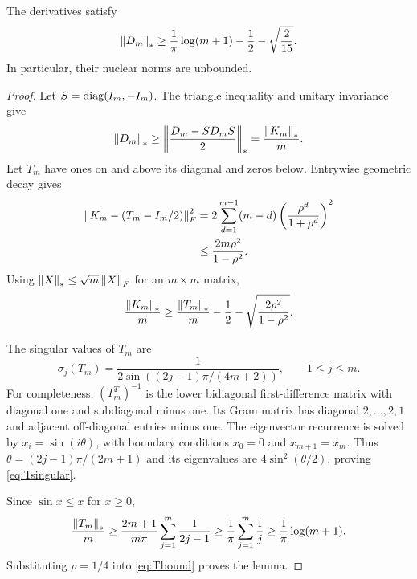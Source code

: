 \documentclass[11pt]{article}
\begin{document}
\begin{lemma}\label{lem:divergence}
The derivatives satisfy
\[
 \left\lVert D_m\right\rVert_*\ge\frac1\pi\log(m+1)-\frac12-\sqrt{\frac2{15}}.
\]
In particular, their nuclear norms are unbounded.
\end{lemma}
\begin{proof}
Let $S=\operatorname{diag}(I_m,-I_m)$. The triangle inequality and unitary invariance give
\[
 \left\lVert D_m\right\rVert_*\ge\left\lVert\frac{D_m-SD_mS}{2}\right\rVert_*
 =\frac{\left\lVert K_m\right\rVert_*}{m}.
\]
Let $T_m$ have ones on and above its diagonal and zeros below. Entrywise geometric decay gives
\begin{align*}
 \left\lVert K_m-(T_m-I_m/2)\right\rVert_F^2
 &=2\sum_{d=1}^{m-1}(m-d)
          \left(\frac{\rho^d}{1+\rho^d}\right)^2\\
 &\le\frac{2m\rho^2}{1-\rho^2}.
\end{align*}
Using $\left\lVert X\right\rVert_*\le\sqrt m\left\lVert X\right\rVert_F$ for an $m\times m$ matrix,
\begin{equation}\label{eq:Tbound}
 \frac{\left\lVert K_m\right\rVert_*}{m}
 \ge\frac{\left\lVert T_m\right\rVert_*}{m}-\frac12
        -\sqrt{\frac{2\rho^2}{1-\rho^2}}.
\end{equation}

The singular values of $T_m$ are
\begin{equation}\label{eq:Tsingular}
 \sigma_j(T_m)=\frac1{2\sin((2j-1)\pi/(4m+2))},
 \qquad 1\le j\le m.
\end{equation}
For completeness, $(T_m^T)^{-1}$ is the lower bidiagonal first-difference matrix with diagonal one and subdiagonal minus one. Its Gram matrix has diagonal $2,\ldots,2,1$ and adjacent off-diagonal entries minus one. The eigenvector recurrence is solved by $x_i=\sin(i\theta)$, with boundary conditions $x_0=0$ and $x_{m+1}=x_m$. Thus $\theta=(2j-1)\pi/(2m+1)$ and its eigenvalues are $4\sin^2(\theta/2)$, proving \eqref{eq:Tsingular}.

Since $\sin x\le x$ for $x\ge0$,
\[
 \frac{\left\lVert T_m\right\rVert_*}{m}
 \ge\frac{2m+1}{m\pi}\sum_{j=1}^m\frac1{2j-1}
 \ge\frac1\pi\sum_{j=1}^m\frac1j
 \ge\frac1\pi\log(m+1).
\]
Substituting $\rho=1/4$ into \eqref{eq:Tbound} proves the lemma.
\end{proof}
\end{document}
